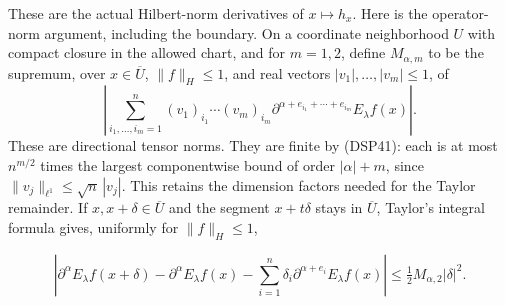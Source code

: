 \documentclass[
  11pt,
]{article}
\begin{document}
These are the actual Hilbert-norm derivatives of \(x\mapsto h_x\). Here
is the operator-norm argument, including the boundary. On a coordinate
neighborhood \(U\) with compact closure in the allowed chart, and for
\(m=1,2\), define \(M_{\alpha,m}\) to be the supremum, over
\(x\in\overline U\), \(\|f\|_H\leq1\), and real vectors
\(|v_1|,\ldots,|v_m|\leq1\), of \[
 \left|
 \sum_{i_1,\ldots,i_m=1}^n
 (v_1)_{i_1}\cdots(v_m)_{i_m}
 \partial^{\alpha+e_{i_1}+\cdots+e_{i_m}}E_\lambda f(x)
 \right|.
\] These are directional tensor norms. They are finite by (DSP41): each
is at most \(n^{m/2}\) times the largest componentwise bound of order
\(|\alpha|+m\), since \(\|v_j\|_{\ell^1}\leq\sqrt n\,|v_j|\). This
retains the dimension factors needed for the Taylor remainder. If
\(x,x+\delta\in\overline U\) and the segment \(x+t\delta\) stays in
\(\overline U\), Taylor's integral formula gives, uniformly for
\(\|f\|_H\leq1\),

\[
 \left|\partial^\alpha E_\lambda f(x+\delta)
 -\partial^\alpha E_\lambda f(x)
 -\sum_{i=1}^n\delta_i\partial^{\alpha+e_i}E_\lambda f(x)\right|
 \le \tfrac12 M_{\alpha,2}|\delta|^2 .
 \tag{DSP43a}
\]
\end{document}
